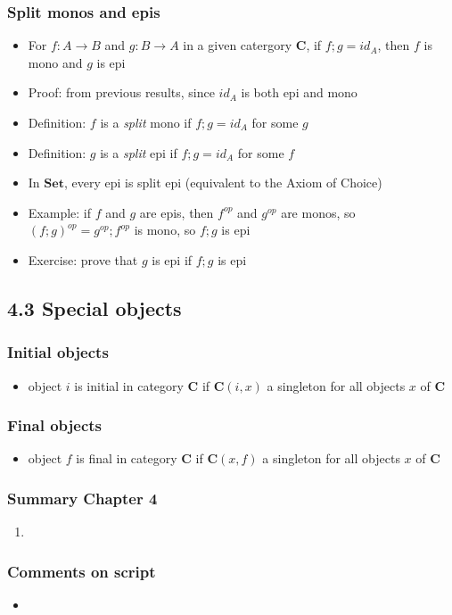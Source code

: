 \documentclass[handout]{beamer}
\newcommand{\bfsf}[1]{{\boldsymbol{#1}}}
\newcommand{\Set}{\bfsf{Set}}
\newcommand{\CC}{\bfsf{C}}
\begin{document}
\frame
  {   
    \frametitle{Split monos and epis}\label{Ch4:SplitMonEp}

 \begin{itemize}[<+->]
\item For $f:A\to B$ and $g:B\to A$ in a given catergory $\CC$,
if $f;g=id_A$, then $f$ is mono and $g$ is epi
\item Proof: from previous results, since $id_A$ is both epi and mono
\item Definition: $f$ is a \emph{split} mono if $f;g=id_A$ for some $g$
\item Definition: $g$ is a \emph{split} epi if $f;g=id_A$ for some $f$
\item In $\Set$, every epi is split epi (equivalent to the Axiom of Choice)
\item Example: if $f$ and $g$ are epis, then  $f^{op}$ and $g^{op}$ are monos,
so $(f;g)^{op}=g^{op} ; f^{op}$ is mono, so $f;g$ is epi
\item Exercise: prove that $g$ is epi if $f;g$ is epi
 \end{itemize}

 }


\subsection{4.3 Special objects}
 
\frame
  {   
    \frametitle{Initial objects}\label{Ch4:InitialObj}

 \begin{itemize}[<+->]
\item object $i$ is initial in category $\CC$ if $\CC(i,x)$ a singleton for all objects $x$ of $\CC$
 \end{itemize}

 }

\frame
  {   
    \frametitle{Final objects}\label{Ch4:FinalObj}

 \begin{itemize}[<+->]
\item object $f$ is final in category $\CC$ if $\CC(x,f)$ a singleton for all objects $x$ of $\CC$
 \end{itemize}

 }


\frame
  {   
    \frametitle{Summary Chapter 4}\label{Ch4:Summary}

 \begin{enumerate}[<+->]
\item 
 \end{enumerate}


}

\frame
  {   
    \frametitle{Comments on script}\label{Ch4:comments}

 \begin{itemize}[<+->]
\item 
 \end{itemize}

 }
\end{document}
